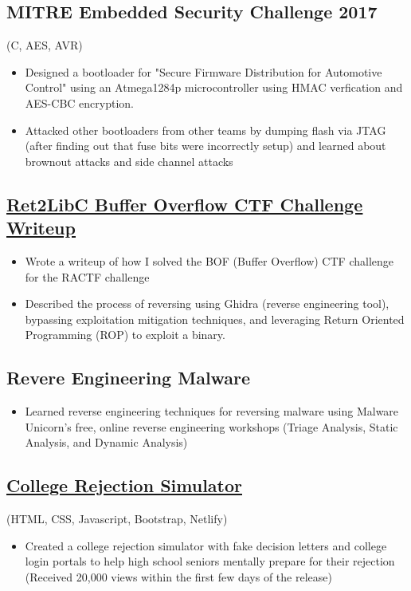 \documentclass{article}
\begin{document}
\subsection{MITRE Embedded Security Challenge 2017} (C, AES, AVR)
\begin{itemize}
    \item Designed a bootloader for "Secure Firmware Distribution for Automotive Control" using an Atmega1284p microcontroller using HMAC verfication and AES-CBC encryption.
    \item Attacked other bootloaders from other teams by dumping flash via JTAG (after finding out that fuse bits were incorrectly setup) and learned about brownout attacks and side channel attacks
\end{itemize}

\subsection{\href{https://jacobshin.com/posts/castorsctf-babybof1pt2/}{ \underline{Ret2LibC Buffer Overflow CTF Challenge Writeup}}}
\begin{itemize}
    \item Wrote a writeup of how I solved the BOF (Buffer Overflow) CTF challenge for the RACTF challenge
    \item Described the process of reversing using Ghidra (reverse engineering tool), bypassing exploitation mitigation techniques, and leveraging Return Oriented Programming (ROP) to exploit a binary.
\end{itemize}

\subsection{Revere Engineering Malware}
\begin{itemize}
    \item Learned reverse engineering techniques for reversing malware using Malware Unicorn's free, online reverse engineering workshops (Triage Analysis, Static Analysis, and Dynamic Analysis)
\end{itemize}

\subsection{\href{https://ivyhub.org/decision-letters/}{\underline{College Rejection Simulator}}} (HTML, CSS, Javascript, Bootstrap, Netlify)
\begin{itemize}
    \item Created a college rejection simulator with fake decision letters and college login portals to help high school seniors mentally prepare for their rejection (Received 20,000 views within the first few days of the release)
\end{itemize}
\end{document}
